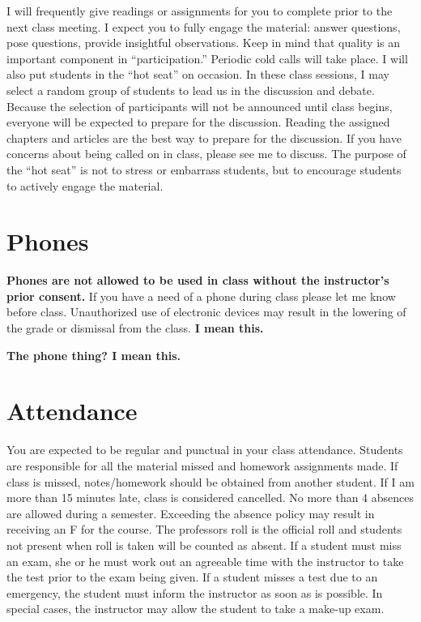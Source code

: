 \documentclass[
]{book}
\begin{document}
I will frequently give readings or assignments for you to complete prior to the next class meeting. I expect you to fully engage the material: answer questions, pose questions, provide insightful observations. Keep in mind that quality is an important component in ``participation.'' Periodic cold calls will take place. I will also put students in the ``hot seat'' on occasion. In these class sessions, I may select a random group of students to lead us in the discussion and debate. Because the selection of participants will not be announced until class begins, everyone will be expected to prepare for the discussion. Reading the assigned chapters and articles are the best way to prepare for the discussion. If you have concerns about being called on in class, please see me to discuss. The purpose of the ``hot seat'' is not to stress or embarrass students, but to encourage students to actively engage the material.

\hypertarget{phones}{%
\section{Phones}\label{phones}}

\textbf{Phones are not allowed to be used in class without the instructor's prior consent.} If you have a need of a phone during class please let me know before class. Unauthorized use of electronic devices may result in the lowering of the grade or dismissal from the class. \textbf{I mean this.}

\textbf{The phone thing? I mean this.}

\hypertarget{attendance}{%
\section{Attendance}\label{attendance}}

You are expected to be regular and punctual in your class attendance. Students are responsible for all the material missed and homework assignments made. If class is missed, notes/homework should be obtained from another student. If I am more than 15 minutes late, class is considered cancelled. No more than 4 absences are allowed during a semester. Exceeding the absence policy may result in receiving an F for the course. The professors roll is the official roll and students not present when roll is taken will be counted as absent. If a student must miss an exam, she or he must work out an agreeable time with the instructor to take the test prior to the exam being given. If a student misses a test due to an emergency, the student must inform the instructor as soon as is possible. In special cases, the instructor may allow the student to take a make-up exam.
\end{document}
